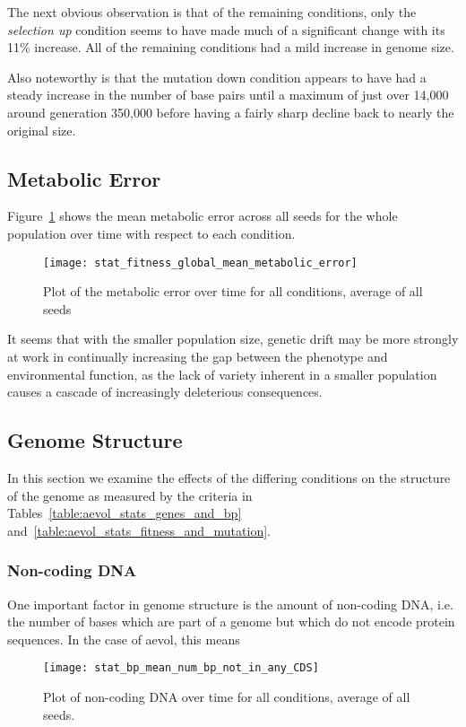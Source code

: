 The next obvious observation is that of the remaining conditions, only the \textit{selection up} condition seems to have made much of a significant change with its 11\% increase. All of the remaining conditions had a mild increase in genome size. 

Also noteworthy is that the mutation down condition appears to have had a steady increase in the number of base pairs until a maximum of just over 14,000 around generation 350,000 before having a fairly sharp decline back to nearly the original size. 

\subsection{Metabolic Error}
Figure~\ref{fig:mean_metabolic_error} shows the mean metabolic error across all seeds for the whole population over time with respect to each condition. 
\begin{figure}[H]
	\texttt{[image: stat\_fitness\_global\_mean\_metabolic\_error]}
	\caption[Metabolic error]{Plot of the metabolic error over time for all conditions, average of all seeds}
	\label{fig:mean_metabolic_error}
\end{figure}
It seems that with the smaller population size, genetic drift may be more strongly at work in continually increasing the gap between the phenotype and environmental function, as the lack of variety inherent in a smaller population causes a cascade of increasingly deleterious consequences. 

\subsection{Genome Structure}
In this section we examine the effects of the differing conditions on the structure of the genome as measured by the criteria in Tables~\ref{table:aevol_stats_genes_and_bp} and~\ref{table:aevol_stats_fitness_and_mutation}. 

\subsubsection{Non-coding DNA}
One important factor in genome structure is the amount of non-coding DNA, i.e. the number of bases which are part of a genome but which do not encode protein sequences. In the case of aevol, this means 
\begin{figure}[H]
	\centering
	\texttt{[image: stat\_bp\_mean\_num\_bp\_not\_in\_any\_CDS]}
	\caption[Non-coding DNA]{Plot of non-coding DNA over time for all conditions, average of all seeds.}
	\label{fig:mean_non-coding_DNA}
\end{figure}

